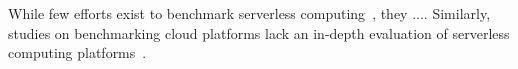 While few efforts exist to benchmark serverless computing~\cite{doi:10.1002/cpe.4792, Kuntsevich:2018:DAB:3284014.3284016, EoPSCE, 10.1007/978-3-319-75178-8_34}, they .... 
Similarly, studies on benchmarking cloud platforms lack an in-depth evaluation of serverless computing platforms~\cite{Gan:2019:OBS:3297858.3304013}. 


 
